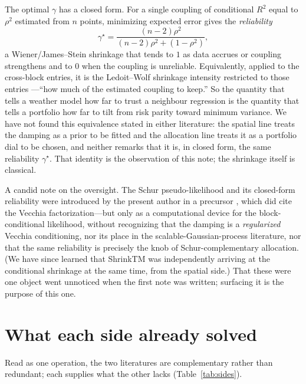 \documentclass[11pt]{article}
\newcommand{\gstar}{\gamma^\star}
\begin{document}
The optimal $\gamma$ has a closed form. For a single coupling of conditional $R^2$ equal to $\rho^2$
estimated from $n$ points, minimizing expected error gives the \emph{reliability}
\begin{equation}
  \gstar=\frac{(n-2)\rho^2}{(n-2)\rho^2+(1-\rho^2)},
\end{equation}
a Wiener/James--Stein shrinkage \citep{james1961,ledoit2012} that tends to $1$ as data accrues or
coupling strengthens and to $0$ when the coupling is unreliable. Equivalently, applied to the
cross-block entries, it is the Ledoit--Wolf shrinkage intensity restricted to those entries
\citep{ledoit2004}---``how much of the estimated coupling to keep.'' So the quantity that tells a
weather model how far to trust a neighbour regression is the quantity that tells a portfolio how far to
tilt from risk parity toward minimum variance. We have not found this equivalence stated in either
literature: the spatial line treats the damping as a prior to be fitted and the allocation line treats
it as a portfolio dial to be chosen, and neither remarks that it is, in closed form, the same
reliability $\gstar$. That identity is the observation of this note; the shrinkage itself is classical.

A candid note on the oversight. The Schur pseudo-likelihood and its closed-form reliability were
introduced by the present author in a precursor \citep{cotton2025psl}, which did cite the Vecchia
factorization---but only as a computational device for the block-conditional likelihood, without
recognizing that the damping is a \emph{regularized} Vecchia conditioning, nor its place
in the scalable-Gaussian-process literature, nor that the same reliability is precisely the knob of
Schur-complementary allocation. (We have since learned that ShrinkTM \citep{chakraborty2025} was
independently arriving at the conditional shrinkage at the same time, from the spatial side.) That these
were one object went unnoticed when the first note was written; surfacing it is the purpose of this one.

\section{What each side already solved}
Read as one operation, the two literatures are complementary rather than redundant; each supplies what
the other lacks (Table~\ref{tab:sides}).
\end{document}
